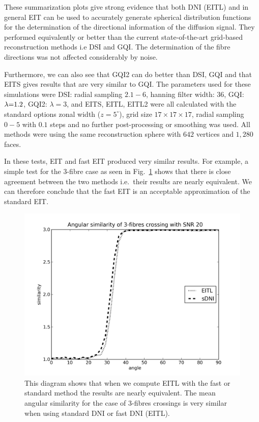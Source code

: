 \documentclass{bioinfo}
\begin{document}
These summarization plots give strong evidence that both DNI (EITL)
and in general EIT can be used to accurately generate spherical distribution
functions for the determination of the directional information of
the diffusion signal. They performed equivalently or better than the
current state-of-the-art grid-based reconstruction methods i.e DSI
and GQI. The determination of the fibre directions was not affected
considerably by noise. 

Furthermore, we can also see that GQI2 can do better than DSI, GQI
and that EITS gives results that are very similar to GQI. The parameters
used for these simulations were DSI: radial sampling $2.1-6$, hanning
filter width: $36$, GQI: $\text{\ensuremath{\lambda}=1.2}$, GQI2:
$\lambda=3$, and EITS, EITL, EITL2 were all calculated with the standard
options zonal width ($z=5^{\circ}$), grid size $17\times17\times17$,
radial sampling $0-5$ with $0.1$ steps and no further post-processing
or smoothing was used. All methods were using the same reconstruction
sphere with $642$ vertices and $1,280$ faces.

In these tests, EIT and fast EIT produced very similar results. For
example, a simple test for the $3$-fibre case as seen in Fig.~\ref{Flo:FastvsStandardEITL}
shows that there is close agreement between the two methods i.e.~their
results are nearly equivalent. We can therefore conclude that the
fast EIT is an acceptable approximation of the standard EIT.

%
\begin{figure}
\centering{}\includegraphics[scale=0.5]{figures/EITL_sEITL}\caption{This diagram shows that when we compute EITL with the fast or standard
method the results are nearly equivalent. The mean angular similarity
for the case of 3-fibres crossings is very similar when using standard
DNI or fast DNI (EITL). }
\label{Flo:FastvsStandardEITL}
\end{figure}
\end{document}
